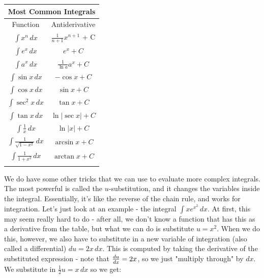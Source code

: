 \begin{center}
	\begin{tabular}{c c}
		\multicolumn{2}{c}{Most Common Integrals}\\ \hline \noalign{\smallskip}
		Function & Antiderivative \\ \hline \hline \noalign{\smallskip}
		$\int x^n \, dx$ & $\frac{1}{n+1}x^{n+1}$ + C\\ \noalign{\smallskip} \hline \noalign{\smallskip}
		$\int e^x \, dx$ & $e^x + C$ \\ \noalign{\smallskip} \hline \noalign{\smallskip}
		$\int a^x \, dx$ & $\frac{1}{\ln a} a^x + C$ \\ \noalign{\smallskip} \hline \noalign{\smallskip}
		$\int \sin x \, dx$ & $-\cos x + C$ \\ \noalign{\smallskip} \hline \noalign{\smallskip}
		$\int \cos x \, dx$ & $\sin x + C$ \\ \noalign{\smallskip} \hline \noalign{\smallskip}
		$\int \sec^2 x \, dx$ & $\tan x + C$ \\ \noalign{\smallskip} \hline \noalign{\smallskip}
		$\int \tan x \, dx$ & $\ln |\sec x| + C$ \\ \noalign{\smallskip} \hline \noalign{\smallskip}
		$\int \frac{1}{x}\, dx$ & $\ln |x| + C$ \\ \noalign{\smallskip} \hline \noalign{\smallskip}
		$\int \frac{1}{\sqrt{1-x^2}} \, dx$ & $\arcsin x + C$ \\ \noalign{\smallskip} \hline \noalign{\smallskip}
		$\int \frac{1}{1+x^2}\, dx$ & $\arctan x + C$ \\ \noalign{\smallskip} \hline \noalign{\smallskip}
	\end{tabular}
\end{center}	
We do have some other tricks that we can use to evaluate more complex integrals. The most powerful is called the $u$-substitution, and it changes the variables inside the integral. Essentially, it's like the reverse of the chain rule, and works for integration. Let's just look at an example -  the integral $\int xe^{x^2} \, dx$. At first, this may seem really hard to do - after all, we don't know a function that has this as a derivative from the table, but what we can do is substitute $u = x^2$. When we do this, however, we also have to substitute in a new variable of integration (also called a differential) $du = 2x \, dx$. This is computed by taking the derivative of the substituted expression - note that $\frac{d u}{d x} = 2x$, so we just "multiply through" by $dx$. We substitute in $\frac{1}{2} u = x\, dx$ so we get:
